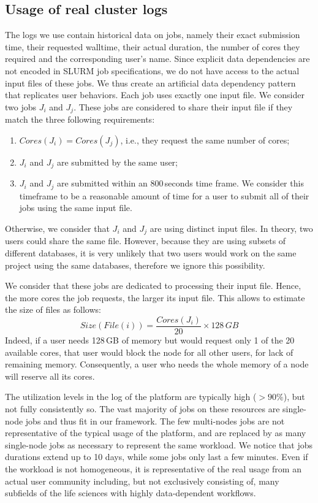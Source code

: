 \documentclass[conference]{IEEEtran}
\newcommand{\file}{\ensuremath{\mathit{File}}\xspace}
\newcommand{\size}{\ensuremath{\mathit{Size}}\xspace}
\newcommand{\core}{\mathit{Cores}\xspace}
\begin{document}
\subsection{Usage of real cluster logs}\label{sec.working}
The logs we use contain historical data on jobs, namely their
exact submission time, their requested walltime, their actual duration, the number of cores they required and the corresponding user's name. 
%
Since explicit data dependencies are not encoded in SLURM job
specifications, we do not have access to the actual input files of
these jobs. We thus create an artificial data dependency pattern that
replicates user behaviors.
Each job uses exactly one input file.
We consider two jobs $J_i$ and $J_j$. These jobs are considered to
share their input file if they match the three following requirements:
\begin{enumerate}
	\item $\core(J_i) = \core(J_j)$, i.e., they request the same number of cores;
	\item $J_i$ and $J_j$ are submitted by the same user;
	\item $J_i$ and $J_j$ are submitted within an 800\,seconds
          time frame. We consider this timeframe to be a reasonable amount of time for a user to submit all of their jobs using the same input file.
\end{enumerate}
Otherwise, we consider that $J_i$ and $J_j$ are using distinct input files. 
In theory, two users could share the same file. 
However, because they are using subsets of different databases, it is very unlikely that two
users would work on the same project using the same databases, therefore we ignore this possibility.

We consider that these jobs are dedicated to processing their input
file. Hence, the more cores the job requests, 
the larger its input file. This allows to estimate the size of files as follows:
$$\size(\file(i)) =\frac{\core(J_i)}{20} \times 128\,GB$$
Indeed, if a user needs 128\,GB of memory but would request only 1 of
the 20 available cores, that user would block the node for all other
users, for lack of remaining memory.
Consequently, a user who needs the whole memory of a node will reserve all its cores. 

The utilization levels in the log of the platform are typically high ($>90\%$), but
not fully consistently so. The vast majority of jobs on these
resources are single-node jobs and thus fit in our framework.
The few multi-nodes jobs are not representative of the typical usage
of the platform, and are replaced by as many single-node jobs as necessary to represent the same workload.
We notice that jobs
durations extend up to 10 days, while some jobs only last a few
minutes. Even if the workload is not homogeneous, it is representative
of the real usage from an actual user community including, but not exclusively consisting of, many subfields of the life sciences with highly data-dependent workflows.
\end{document}
